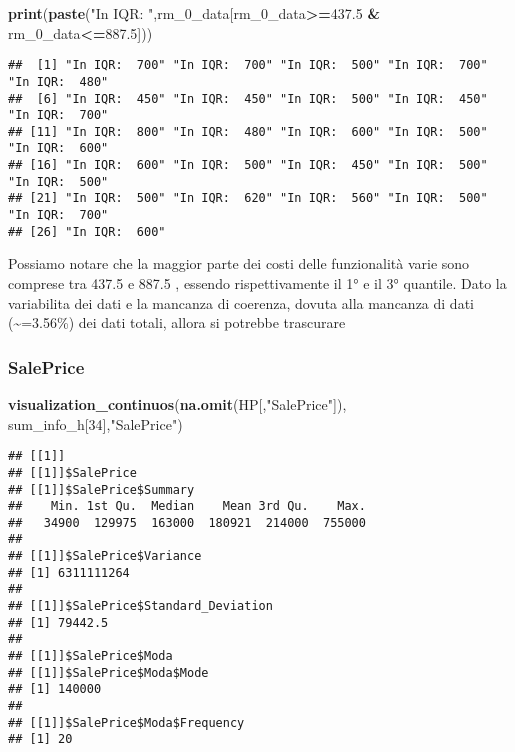 \documentclass[
]{article}
\newenvironment{Shaded}{\begin{snugshade}}{\end{snugshade}}
\newcommand{\DecValTok}[1]{\textcolor[rgb]{0.00,0.00,0.81}{#1}}
\newcommand{\FloatTok}[1]{\textcolor[rgb]{0.00,0.00,0.81}{#1}}
\newcommand{\FunctionTok}[1]{\textcolor[rgb]{0.13,0.29,0.53}{\textbf{#1}}}
\newcommand{\NormalTok}[1]{#1}
\newcommand{\SpecialCharTok}[1]{\textcolor[rgb]{0.81,0.36,0.00}{\textbf{#1}}}
\newcommand{\StringTok}[1]{\textcolor[rgb]{0.31,0.60,0.02}{#1}}
\begin{document}
\begin{Shaded}
\begin{Highlighting}[]
\FunctionTok{print}\NormalTok{(}\FunctionTok{paste}\NormalTok{(}\StringTok{"In IQR: "}\NormalTok{,rm\_0\_data[rm\_0\_data}\SpecialCharTok{\textgreater{}=}\FloatTok{437.5} \SpecialCharTok{\&}\NormalTok{ rm\_0\_data}\SpecialCharTok{\textless{}=}\FloatTok{887.5}\NormalTok{]))}
\end{Highlighting}
\end{Shaded}

\begin{verbatim}
##  [1] "In IQR:  700" "In IQR:  700" "In IQR:  500" "In IQR:  700" "In IQR:  480"
##  [6] "In IQR:  450" "In IQR:  450" "In IQR:  500" "In IQR:  450" "In IQR:  700"
## [11] "In IQR:  800" "In IQR:  480" "In IQR:  600" "In IQR:  500" "In IQR:  600"
## [16] "In IQR:  600" "In IQR:  500" "In IQR:  450" "In IQR:  500" "In IQR:  500"
## [21] "In IQR:  500" "In IQR:  620" "In IQR:  560" "In IQR:  500" "In IQR:  700"
## [26] "In IQR:  600"
\end{verbatim}

Possiamo notare che la maggior parte dei costi delle funzionalità varie
sono comprese tra 437.5 e 887.5 , essendo rispettivamente il 1° e il 3°
quantile. Dato la variabilita dei dati e la mancanza di coerenza, dovuta
alla mancanza di dati (\textasciitilde=3.56\%) dei dati totali, allora
si potrebbe trascurare

\subsubsection{SalePrice}\label{saleprice}

\begin{Shaded}
\begin{Highlighting}[]
\FunctionTok{visualization\_continuos}\NormalTok{(}\FunctionTok{na.omit}\NormalTok{(HP[,}\StringTok{"SalePrice"}\NormalTok{]), sum\_info\_h[}\DecValTok{34}\NormalTok{],}\StringTok{"SalePrice"}\NormalTok{)}
\end{Highlighting}
\end{Shaded}

\begin{verbatim}
## [[1]]
## [[1]]$SalePrice
## [[1]]$SalePrice$Summary
##    Min. 1st Qu.  Median    Mean 3rd Qu.    Max. 
##   34900  129975  163000  180921  214000  755000 
## 
## [[1]]$SalePrice$Variance
## [1] 6311111264
## 
## [[1]]$SalePrice$Standard_Deviation
## [1] 79442.5
## 
## [[1]]$SalePrice$Moda
## [[1]]$SalePrice$Moda$Mode
## [1] 140000
## 
## [[1]]$SalePrice$Moda$Frequency
## [1] 20
\end{verbatim}
\end{document}
